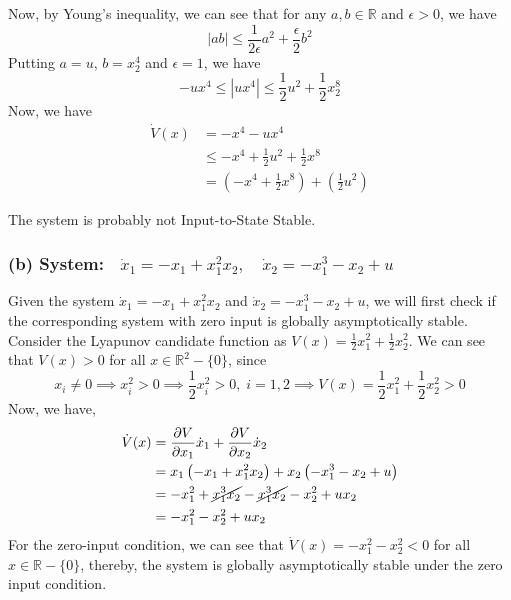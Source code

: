 Now, by Young's inequality, we can see that for any \( a, b \in \mathbb{R} \) and \( \epsilon > 0 \), we have
\begin{equation*}
    \left| a b \right|
    \leq
    \frac{1}{2 \epsilon} a^2 + \frac{\epsilon}{2} b^2
\end{equation*}
Putting \( a = u \), \( b = x_2^4 \) and \( \epsilon = 1 \), we have
\begin{equation*}
    - u x^4 \leq \left| u x^4 \right|
    \leq
    \frac{1}{2} u^2 + \frac{1}{2} x_2^8
\end{equation*}
Now, we have
\begin{align*}
    \dot{V}(x)
     & =
    -x^4 - u x^4
    \\ & \leq
    -x^4 + \frac{1}{2} u^2 + \frac{1}{2} x^8
    \\ & =
    \left( -x^4 + \frac{1}{2} x^8 \right) + \left( \frac{1}{2} u^2 \right)
\end{align*}

The system is probably not Input-to-State Stable.

\clearpage
\subsubsection*{(b) System:\( \quad \dot{x}_{1}=-x_{1}+x_{1}^{2} x_{2}, \quad \dot{x}_{2}=-x_{1}^{3}-x_{2}+u \)}

Given the system \( \dot{x}_{1}=-x_{1}+x_{1}^{2} x_{2} \) and \( \dot{x}_{2}=-x_{1}^{3}-x_{2}+u \), we will first check if the corresponding system with zero input is globally asymptotically stable.
Consider the Lyapunov candidate function as \( V(x)=\frac{1}{2} x_{1}^{2}+\frac{1}{2} x_{2}^{2} \).
We can see that \( V(x) > 0 \) for all \( x \in \mathbb{R}^2 - \{ 0 \} \), since
\begin{equation*}
    x_i \neq 0
    \implies
    x_i^2 > 0
    \implies
    \frac{1}{2} x_i^2 > 0,
    \;
    i = 1, 2
    \implies
    V(x)
    =
    \frac{1}{2} x_1^2 + \frac{1}{2} x_2^2
    > 0
\end{equation*}
Now, we have,
\begin{align*}
    \dot{V}(x)
     & =
    \frac{\partial V}{\partial x_1} \dot{x}_1 + \frac{\partial V}{\partial x_2} \dot{x}_2
    \\
     & =
    x_1 \left( -x_1 + x_1^2 x_2 \right) + x_2 \left( -x_1^3 - x_2 + u \right)
    \\
     & =
    -x_1^2 + \cancel{x_1^3 x_2} - \cancel{x_1^3 x_2} - x_2^2 + u x_2
    \\
     & =
    -x_1^2 - x_2^2 + u x_2
\end{align*}
For the zero-input condition, we can see that \( \dot{V}(x) = -x_1^2 - x_2^2 < 0 \) for all \( x \in \mathbb{R} - \{ 0 \} \), thereby, the system is globally asymptotically stable under the zero input condition.

